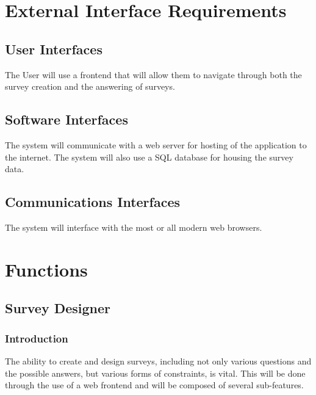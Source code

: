 \documentclass[10pt,letter]{report}
\def\hl#1{#1}
\begin{document}
\section{External Interface Requirements}
\label{sec:extern-interf-requ}

\subsection{User Interfaces}
\label{sec:user-interfaces}

The User will use a frontend that will allow them to navigate through
both the survey creation and the answering of surveys.

\subsection{Software Interfaces}
\label{sec:software-interfaces}

The system will communicate with a web server for hosting of the
application to the internet. The system will also use a SQL database
for housing the survey data.

\subsection{Communications Interfaces}
\label{sec:comm-interf}

The system will interface with the most or all modern web browsers.

\section{Functions}
\label{sec:functions}

\subsection{Survey Designer}
\label{sec:survey-designer}

\subsubsection{Introduction}
\label{sec:introduction-designer}

The ability to create and design surveys, including not only various
questions and the possible answers, but various forms of \hl{constraints},
is vital.  This will be done through the use of a web frontend and will be
composed of several sub-features.
\end{document}
